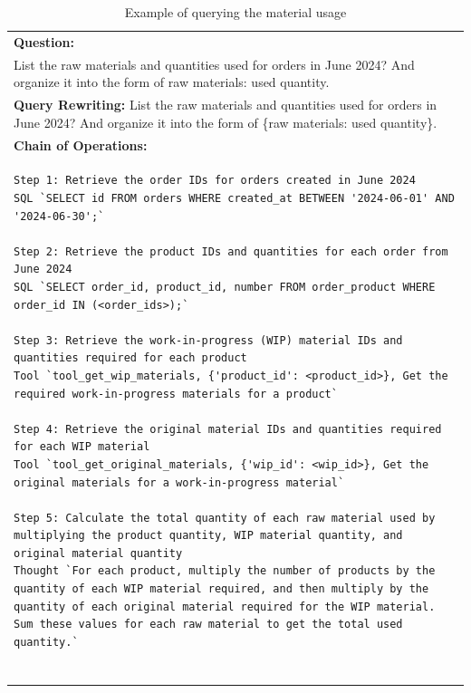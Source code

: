 \documentclass[preprint,12pt]{elsarticle}
\begin{document}
\begin{center}
\begin{longtable}{p{390pt}}
\caption{Example of querying the material usage}
    \label{tab:case_query_material}\\
    \toprule
      \textbf{Question:}     \\
       List the raw materials and quantities used for orders in June 2024? And organize it into the form of {raw materials: used quantity}.\\
          \hline
          \textbf{Query Rewriting: }
          List the raw materials and quantities used for orders in June 2024? And organize it into the form of \{raw materials: used quantity\}.\\
 \hline
\textbf{Chain of Operations:}\\

\begin{lstlisting}[style=my_operation, label={lst:chain_of_operation}]
Step 1: Retrieve the order IDs for orders created in June 2024
SQL `SELECT id FROM orders WHERE created_at BETWEEN '2024-06-01' AND '2024-06-30';`

Step 2: Retrieve the product IDs and quantities for each order from June 2024
SQL `SELECT order_id, product_id, number FROM order_product WHERE order_id IN (<order_ids>);`

Step 3: Retrieve the work-in-progress (WIP) material IDs and quantities required for each product
Tool `tool_get_wip_materials, {'product_id': <product_id>}, Get the required work-in-progress materials for a product`

Step 4: Retrieve the original material IDs and quantities required for each WIP material
Tool `tool_get_original_materials, {'wip_id': <wip_id>}, Get the original materials for a work-in-progress material`

Step 5: Calculate the total quantity of each raw material used by multiplying the product quantity, WIP material quantity, and original material quantity
Thought `For each product, multiply the number of products by the quantity of each WIP material required, and then multiply by the quantity of each original material required for the WIP material. Sum these values for each raw material to get the total used quantity.`


\end{lstlisting}
\end{longtable}
\end{center}
\end{document}
